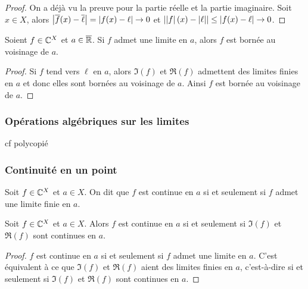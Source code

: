 \begin{proof}
  On a déjà vu la preuve pour la partie réelle et la partie imaginaire. Soit $x \in X$, alors $\left\lvert\overline{f}(x)-\overline{\ell}\right\rvert = \left\lvert f(x)-\ell\right\rvert \rightarrow 0$ et $\left\lvert\left\lvert f\right\rvert(x)-\left\lvert\ell\right\rvert\right\rvert \leq \left\lvert f(x)-\ell\right\rvert \rightarrow 0$.
\end{proof}
\begin{prop}
  Soient $f \in \mathbb{C}^X$ et $a \in \overline{\mathbb{R}}$. Si $f$ admet une limite en $a$, alors $f$ est bornée au voisinage de $a$.
\end{prop}
\begin{proof}
  Si $f$ tend vers $\ell$ en $a$, alors $\Im(f)$ et $\Re(f)$ admettent des limites finies en $a$ et donc elles sont bornées au voisinage de $a$. Ainsi $f$ est bornée au voisinage de $a$.
\end{proof}
\subsubsection{Opérations algébriques sur les limites}
cf polycopié
\subsubsection{Continuité en un point}
\begin{defdef}
  Soit $f \in \mathbb{C}^X$ et $a \in X$. On dit que $f$ est continue en $a$ si et seulement si $f$ admet une limite finie en $a$.
\end{defdef}
\begin{prop}
  Soit $f \in \mathbb{C}^X$ et $a \in X$. Alors $f$ est continue en $a$ si et seulement si $\Im(f)$ et $\Re(f)$ sont continues en $a$. 
\end{prop}
\begin{proof}
  $f$ est continue en $a$ si et seulement si $f$ admet une limite en $a$. C'est équivalent à ce que $\Im(f)$ et $\Re(f)$ aient des limites finies en $a$, c'est-à-dire si et seulement si $\Im(f)$ et $\Re(f)$ sont continues en $a$.
\end{proof}
